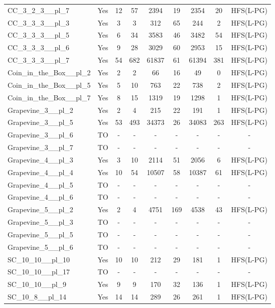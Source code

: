 \documentclass{article}
\begin{document}
\begin{tabular}{lcccccccc}
CC\_3\_2\_3\_\_pl\_7 & Yes & 12 & 57 & 2394 & 19 & 2354 & 20 & HFS(L-PG) \\
CC\_3\_3\_3\_\_pl\_3 & Yes & 3 & 3 & 312 & 65 & 244 & 2 & HFS(L-PG) \\
CC\_3\_3\_3\_\_pl\_5 & Yes & 6 & 34 & 3583 & 46 & 3482 & 54 & HFS(L-PG) \\
CC\_3\_3\_3\_\_pl\_6 & Yes & 9 & 28 & 3029 & 60 & 2953 & 15 & HFS(L-PG) \\
CC\_3\_3\_3\_\_pl\_7 & Yes & 54 & 682 & 61837 & 61 & 61394 & 381 & HFS(L-PG) \\
Coin\_in\_the\_Box\_\_pl\_2 & Yes & 2 & 2 & 66 & 16 & 49 & 0 & HFS(L-PG) \\
Coin\_in\_the\_Box\_\_pl\_5 & Yes & 5 & 10 & 763 & 22 & 738 & 2 & HFS(L-PG) \\
Coin\_in\_the\_Box\_\_pl\_7 & Yes & 8 & 15 & 1319 & 19 & 1298 & 1 & HFS(L-PG) \\
Grapevine\_3\_\_pl\_2 & Yes & 2 & 4 & 215 & 22 & 191 & 1 & HFS(L-PG) \\
Grapevine\_3\_\_pl\_5 & Yes & 53 & 493 & 34373 & 26 & 34083 & 263 & HFS(L-PG) \\
Grapevine\_3\_\_pl\_6 & TO & - & - & - & - & - & - & - \\
Grapevine\_3\_\_pl\_7 & TO & - & - & - & - & - & - & - \\
Grapevine\_4\_\_pl\_3 & Yes & 3 & 10 & 2114 & 51 & 2056 & 6 & HFS(L-PG) \\
Grapevine\_4\_\_pl\_4 & Yes & 10 & 54 & 10507 & 58 & 10387 & 61 & HFS(L-PG) \\
Grapevine\_4\_\_pl\_5 & TO & - & - & - & - & - & - & - \\
Grapevine\_4\_\_pl\_6 & TO & - & - & - & - & - & - & - \\
Grapevine\_5\_\_pl\_2 & Yes & 2 & 4 & 4751 & 169 & 4538 & 43 & HFS(L-PG) \\
Grapevine\_5\_\_pl\_3 & TO & - & - & - & - & - & - & - \\
Grapevine\_5\_\_pl\_5 & TO & - & - & - & - & - & - & - \\
Grapevine\_5\_\_pl\_6 & TO & - & - & - & - & - & - & - \\
SC\_10\_10\_\_pl\_10 & Yes & 10 & 10 & 212 & 29 & 181 & 1 & HFS(L-PG) \\
SC\_10\_10\_\_pl\_17 & TO & - & - & - & - & - & - & - \\
SC\_10\_10\_\_pl\_9 & Yes & 9 & 9 & 170 & 32 & 136 & 1 & HFS(L-PG) \\
SC\_10\_8\_\_pl\_14 & Yes & 14 & 14 & 289 & 26 & 261 & 1 & HFS(L-PG) \\

\end{tabular}
\end{document}
